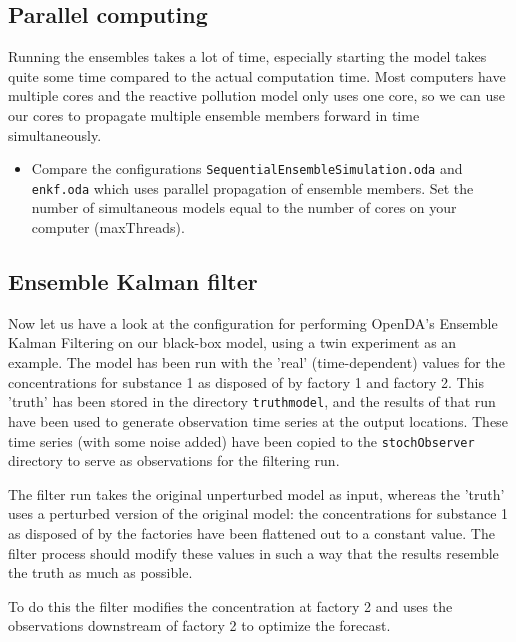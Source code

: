 \subsection{Parallel computing}
Running the ensembles takes a lot of time, especially starting the model takes quite some time compared to the actual computation time. Most computers have multiple cores and the reactive pollution model only uses one core, so we can use our cores to propagate multiple ensemble members forward in time simultaneously. 
\begin{itemize}
	\item Compare the configurations {\tt SequentialEnsembleSimulation.oda} and\\
		{\tt enkf.oda} which uses parallel propagation of ensemble members. Set the number of simultaneous models equal to the number of cores on your computer (maxThreads).
\end{itemize}

\subsection{Ensemble Kalman filter}


Now let us have a look at the configuration for performing OpenDA's Ensemble
Kalman Filtering on our black-box model, using a twin experiment as an example.
The model has been run with the 'real' (time-dependent) values for the
concentrations for substance 1 as disposed of by factory 1 and factory 2. This
'truth' has been stored in the directory {\tt truthmodel}, and the results of that run
have been used to generate observation time series at the output locations.
These time series (with some noise added) have been copied to the {\tt stochObserver} directory to
serve as observations for the filtering run.

The filter run takes the original unperturbed model as input, whereas the 'truth' 
uses a perturbed version of the original model: the concentrations for substance 1 as disposed of by the
factories have been flattened out to a constant value. The filter process
should modify these values in such a way that the results resemble the truth as
much as possible.

To do this the filter modifies the concentration at factory 2 and uses the
observations downstream of factory 2 to optimize the forecast.

